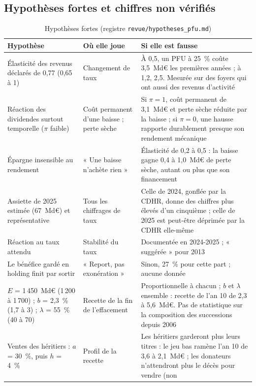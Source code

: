\documentclass[11pt,a4paper]{article}
\begin{document}
\subsection{Hypothèses fortes et chiffres non vérifiés}

\begin{table}[!htbp]\centering\scriptsize
\caption{Hypothèses fortes (registre \texttt{revue/hypotheses\_pfu.md})}\label{tab:pfu_a_hyp}
\begin{tabularx}{\linewidth}{@{}>{\raggedright\arraybackslash}p{4.4cm}>{\raggedright\arraybackslash}p{3.3cm}>{\raggedright\arraybackslash}X@{}}
\toprule
Hypothèse & Où elle joue & Si elle est fausse \\
\midrule
Élasticité des revenus déclarés de 0,77 (0,65 à 1) & Changement de taux & À 0,5, un PFU à 25~\% coûte 3,5~Md€ les
premières années ; à 1,2, 2,5. Mesurée sur des foyers qui ont aussi des revenus d'activité \\
Réaction des dividendes surtout temporelle ($\pi$ faible) & Coût permanent d'une baisse ; perte sèche & Si
$\pi = 1$, coût permanent de 3,1~Md€ et perte sèche réduite par la baisse ; si $\pi = 0$, une hausse rapporte
durablement presque son rendement mécanique \\
Épargne insensible au rendement & « Une baisse n'achète rien » & Élasticité de 0,2 à 0,5 : la baisse gagne 0,4 à
1,0~Md€ de perte sèche, autant ou plus que son financement \\
Assiette de 2025 estimée (67~Md€) et représentative & Tous les chiffrages de taux & Celle de 2024, gonflée par la
CDHR, donne des chiffres plus élevés d'un cinquième ; celle de 2025 est peut-être déprimée par la CDHR elle-même \\
Réaction au taux attendu & Stabilité du taux & Documentée en 2024-2025 ; « suggérée » pour 2013 \\
Le bénéfice gardé en holding finit par sortir & « Report, pas exonération » & Sinon, 27~\% pour cette part ; aucune
donnée \\
$E$ = 1\,450~Md€ (1\,200 à 1\,700) ; $b$ = 2,3~\% (1,7 à 3) ; $\lambda$ = 55~\% (40 à 70) & Recette de la fin de
l'effacement & Proportionnelle à chacun ; $b$ et $\lambda$ ensemble : recette de l'an 10 de 2,3 à 5,6~Md€. Pas de
statistique sur la composition des successions depuis 2006 \\
Ventes des héritiers : $a$ = 30~\%, puis $h$ = 4~\% & Profil de la recette & Les héritiers garderont plus leurs
titres : le jeu bas ramène l'an 10 de 3,6 à 2,1~Md€ ; les donateurs n'attendront plus le décès pour vendre (non

\end{tabularx}
\end{table}
\end{document}
